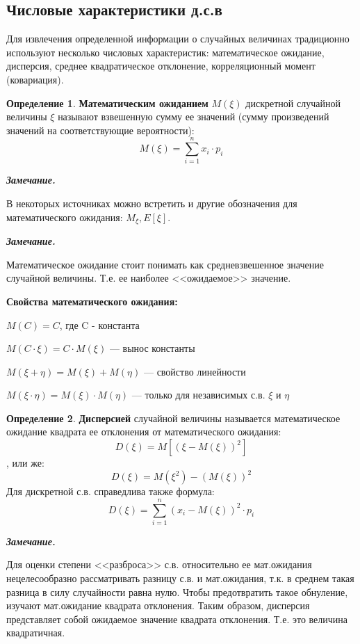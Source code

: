 \documentclass[12pt,a4paper]{article}
\newcommand{\deglistwithtitle}[2]{%
    \noindent\textbf{#1}\par\vspace{0.3em}
    \begin{deglist}
        #2
    \end{deglist}
}
\theoremstyle{definition}
\newtheorem{definition}{Определение}[section]
\theoremstyle{definition}
\theoremstyle{remark}
\newenvironment{remark}{
  \par\noindent\textbf{\textit{Замечание.}}~
}{\par}
\theoremstyle{corollary}
\newcommand{\nextblock}{\vspace{1.5em}\noindent}
\theoremstyle{bolditalic}
\begin{document}
\subsection{Числовые характеристики д.с.в}

Для извлечения определенной информации о случайных величинах традиционно используют несколько числовых характеристик: математическое ожидание, дисперсия, среднее квадратическое отклонение, корреляционный момент (ковариация).

\begin{definition}
    \textbf{Математическим ожиданием} $M(\xi)$ дискретной случайной величины $\xi$ называют взвешенную сумму ее значений (сумму произведений значений на соответствующие вероятности):
    \[
    M(\xi)= \sum_{i=1}^{n}{x_i \cdot p_i}
    \]
\end{definition}

\begin{remark}
    В некоторых источниках можно встретить и другие обозначения для математического ожидания: $M_\xi, E[\xi]$.
\end{remark}
\begin{remark}
    Математическое ожидание стоит понимать как средневзвешенное значение случайной величины. Т.е. ее наиболее <<ожидаемое>> значение. 
\end{remark}

\nextblock

\deglistwithtitle{Свойства математического ожидания:}{
    \item $M(C)=C$, где C - константа
    \item $M(C\cdot \xi)=C\cdot M(\xi)$ --- вынос константы
    \item $M(\xi + \eta)=M(\xi)+M(\eta)$ --- свойство линейности
    \item $M(\xi \cdot \eta)=M(\xi)\cdot M(\eta)$ --- только для независимых с.в. $\xi$ и $\eta$
}

\nextblock

\begin{definition}
    \textbf{Дисперсией} случайной величины называется математическое ожидание квадрата ее отклонения от математического ожидания:
     \[
     D(\xi)=M[(\xi-M(\xi))^2]
     \], или же:
     \[
     D(\xi)=M(\xi^2)-(M(\xi))^2
     \]
     Для дискретной с.в. справедлива также формула:
     \[
     D(\xi)=\sum_{i=1}^{n}{(x_i-M(\xi))^2\cdot p_i}
     \]
\end{definition}

\begin{remark}
    Для оценки степени <<разброса>> с.в. относительно ее мат.ожидания нецелесообразно рассматривать разницу с.в. и мат.ожидания, т.к. в среднем такая разница в силу случайности равна нулю. Чтобы предотвратить такое обнуление, изучают мат.ожидание квадрата отклонения. Таким образом, дисперсия представляет собой ожидаемое значение квадрата отклонения. Т.е. это величина квадратичная.
\end{remark}
\end{document}
